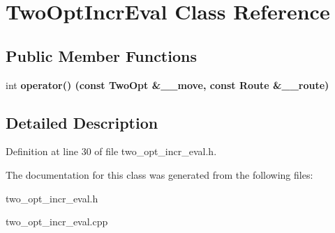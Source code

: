 \section{Two\-Opt\-Incr\-Eval Class Reference}
\label{class_two_opt_incr_eval}
\subsection*{Public Member Functions}
\begin{CompactItemize}
\item 
int \bf{operator()} (const \bf{Two\-Opt} \&\_\-\_\-move, const Route \&\_\-\_\-route)\label{class_two_opt_incr_eval_48500077e651c4c6152daef8a396be39}

\end{CompactItemize}


\subsection{Detailed Description}




Definition at line 30 of file two\_\-opt\_\-incr\_\-eval.h.

The documentation for this class was generated from the following files:\begin{CompactItemize}
\item 
two\_\-opt\_\-incr\_\-eval.h\item 
two\_\-opt\_\-incr\_\-eval.cpp\end{CompactItemize}
